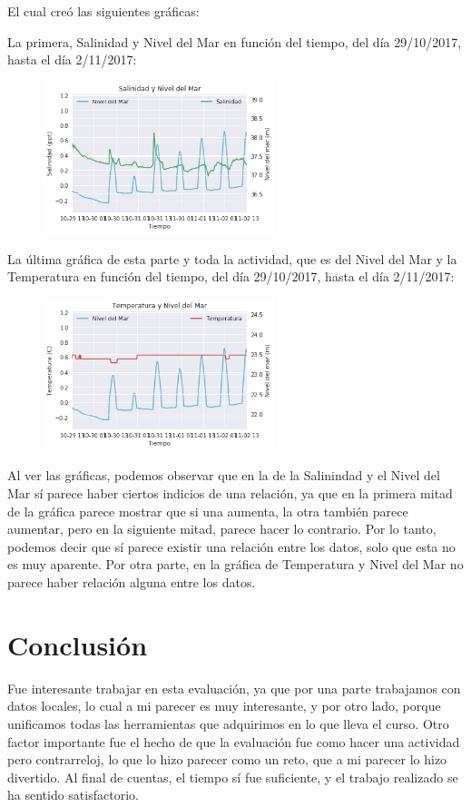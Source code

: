 \documentclass[a4paper]{article}
\begin{document}
El cual creó las siguientes gráficas:

\pagebreak
La primera, Salinidad y Nivel del Mar en función del tiempo, del día 29/10/2017, hasta el día 2/11/2017:
\begin{figure}[ht!]
 \centering
  \includegraphics[width=0.6\textwidth]{Matplotlib6.png}
\end{figure}

La última gráfica de esta parte y toda la actividad, que es del Nivel del Mar y la Temperatura en función del tiempo, del día 29/10/2017, hasta el día 2/11/2017:
\begin{figure}[ht!]
 \centering
  \includegraphics[width=0.6\textwidth]{Matplotlib7.png}
\end{figure}

Al ver las gráficas, podemos observar que en la de la Salinindad y el Nivel del Mar sí parece haber ciertos indicios de una relación, ya que en la primera mitad de la gráfica parece mostrar que si una aumenta, la otra también parece aumentar, pero en la siguiente mitad, parece hacer lo contrario. Por lo tanto, podemos decir que sí parece existir una relación entre los datos, solo que esta no es muy aparente.
Por otra parte, en la gráfica de Temperatura y Nivel del Mar no parece haber relación alguna entre los datos. 

\bigskip
\section{Conclusión}
Fue interesante trabajar en esta evaluación, ya que por una parte trabajamos con datos locales, lo cual a mi parecer es muy interesante, y por otro lado, porque unificamos todas las herramientas que adquirimos en lo que lleva el curso. Otro factor importante fue el hecho de que la evaluación fue como hacer una actividad pero contrarreloj, lo que lo hizo parecer como un reto, que a mi parecer lo hizo divertido. Al final de cuentas, el tiempo sí fue suficiente, y el trabajo realizado se ha sentido satisfactorio. 
\end{document}
